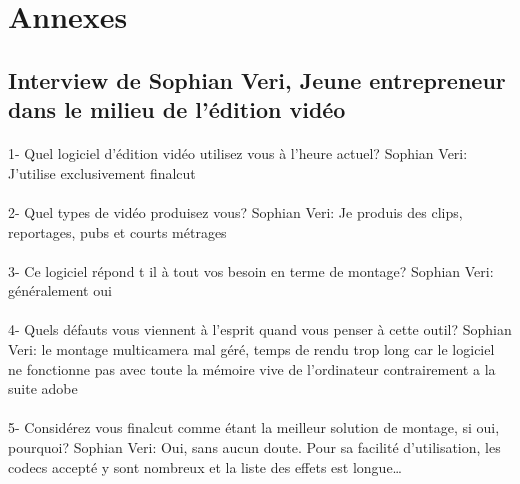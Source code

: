 \newpage
  \section {Annexes}
    \subsection {Interview de Sophian Veri,
    Jeune entrepreneur dans le milieu de l'édition vidéo}

        \paragraph{}
         1-  Quel logiciel d'édition vidéo utilisez vous à l'heure actuel?
            Sophian Veri: J'utilise exclusivement finalcut

        \paragraph{}
         2- Quel types de vidéo produisez vous?
            Sophian Veri: Je produis des clips, reportages, pubs et courts métrages

        \paragraph{}
         3- Ce logiciel répond t il à tout vos besoin en terme de montage?
            Sophian Veri: généralement oui

        \paragraph{}
         4- Quels défauts vous viennent à l'esprit quand vous penser à cette outil?
            Sophian Veri: le montage multicamera mal géré, temps de rendu trop long car le
            logiciel ne fonctionne pas avec toute la mémoire vive de l'ordinateur
            contrairement a la suite adobe

        \paragraph{}
         5- Considérez vous finalcut comme étant la meilleur solution de montage,
            si oui, pourquoi?
            Sophian Veri: Oui, sans aucun doute. Pour sa facilité d'utilisation,
            les codecs accepté y sont nombreux et la liste des effets est
            longue\ldots

